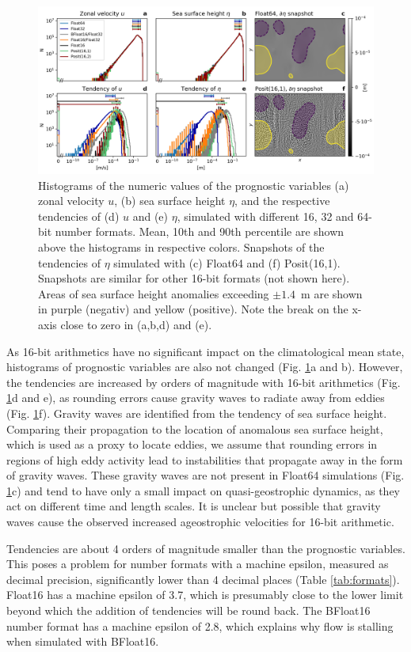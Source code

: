\documentclass[draft]{agujournal2019}
\begin{document}
\begin{figure}
\includegraphics[width=1\textwidth]{tendency_hist.png}
\caption{Histograms of the numeric values of the prognostic variables (a) zonal
velocity $u$, (b) sea surface height $\eta$, and the respective tendencies of
(d) $u$ and (e) $\eta$, simulated with different 16, 32 and 64-bit number formats.
Mean, 10th and 90th percentile are shown above the histograms in respective colors.
Snapshots of the tendencies of $\eta$ simulated with (c) Float64 and (f) Posit(16,1).
Snapshots are similar for other 16-bit formats (not shown here). Areas of sea
surface height anomalies exceeding $\pm1.4$~m are shown in purple (negativ) and
yellow (positive). Note the break on the x-axis close to zero in (a,b,d) and (e).}
\label{fig:tend}
\end{figure}

As 16-bit arithmetics have no significant impact on the climatological mean state,
histograms of prognostic variables are also not changed (Fig. \ref{fig:tend}a and b).
However, the tendencies are increased by orders of magnitude with 16-bit arithmetics
(Fig. \ref{fig:tend}d and e), as rounding errors cause gravity waves to radiate
away from eddies (Fig. \ref{fig:tend}f). Gravity waves are identified from the
tendency of sea surface height. Comparing their propagation to the location of
anomalous sea surface height, which is used as a proxy to locate eddies, we
assume that rounding errors in regions of high eddy activity lead to instabilities
that propagate away in the form of gravity waves. These gravity waves are not
present in Float64 simulations (Fig. \ref{fig:tend}c) and tend to have only a
small impact on quasi-geostrophic dynamics, as they act on different time and
length scales. It is unclear but possible that gravity waves cause the observed
increased ageostrophic velocities for 16-bit arithmetic.

Tendencies are about 4 orders of magnitude smaller than the prognostic variables.
This poses a problem for number formats with a machine epsilon, measured as decimal
precision, significantly lower than 4 decimal places (Table \ref{tab:formats}).
Float16 has a machine epsilon of 3.7, which is presumably close to the lower limit
beyond which the addition of tendencies will be round back. The BFloat16 number
format has a machine epsilon of 2.8, which explains why flow is stalling when
simulated with BFloat16.
\end{document}
